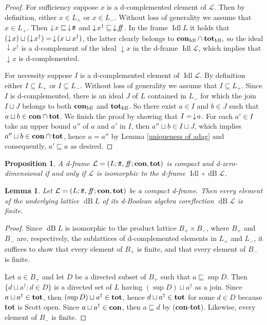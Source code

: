 \documentclass[11pt]{article}
\DeclareMathOperator{\idl}{Idl}
\DeclareMathOperator{\dB}{dB}
\theoremstyle{plain}
\newtheorem{lem}[thm]{Lemma}
\newtheorem{prop}[thm]{Proposition}
\theoremstyle{definition}
\newcommand{\dbt}{{t\!t}}
\newcommand{\dbf}{{f\!\!f}}
\begin{document}
\begin{proof} For sufficiency suppose $x$ is a d-complemented element of $\mathcal{L}$. Then by definition, either $x\in L_+$ or $x\in L_-$. Without loss of generality we assume that  $x\in L_+$.  Then $\downarrow\!x\sqsubseteq\thinspace \downarrow\!\dbt$ and $\downarrow\!x^\dag\sqsubseteq\thinspace \downarrow\!\dbf$. In the frame $\idl L$ it holds that $(\downarrow\!x)\sqcup(\downarrow\!x^\dag)= \thinspace \downarrow\!(x\sqcup x^\dag)$, the latter clearly belongs to ${\bf con}_{\idl}\cap{\bf tot}_{\idl},$  so the ideal $\downarrow\!x^\dag$ is a d-complement of the ideal $\downarrow\!x$ in the d-frame $\idl\mathcal{L}$, which implies that $\downarrow\!x$ is  d-complemented. 

For necessity  suppose $I$ is a d-complemented element of $\idl \mathcal{L}$. By definition either $I\subseteq L_+$ or $I\subseteq L_-$. Without loss of generality we assume that $I\subseteq L_+$. Since $I$ is d-complemented, there is an ideal $J$ of $L$ contained in $L_-$ for which the join $I\sqcup J$ belongs to both ${\bf con}_{\idl}$ and ${\bf tot}_{\idl}$. So there exist $a\in I$ and $b\in J$ such that $a\sqcup b\in{\bf con}\cap{\bf tot}$. We finish the proof by  showing that $I=\thinspace\downarrow\!a$. For each $a'\in I$ take an upper bound $a''$ of $a$ and $a'$ in $I$, then $a''\sqcup b\in I\sqcup J$, which implies $a''\sqcup b\in {\bf con}\cap{\bf tot}$, hence $a=a''$ by Lemma \ref{uniqueness of adag} and consequently, $a'\sqsubseteq a$ as desired.  \end{proof}

\begin{prop}\label{other side of the duality} A d-frame  $\mathcal{L}=(L;\dbt,\dbf;{\bf con},{\bf tot})$ is   compact and d-zero-dimensional if and only if $\mathcal{L}$ is isomorphic to the d-frame   $ \idl\circ\dB \mathcal{L}$. 
\end{prop}
 
\begin{lem}\label{each element of dBL is finite}
Let $\mathcal{L}=(L;\dbt,\dbf;{\bf con},{\bf tot})$ be a compact d-frame. Then every element of the underlying lattice $\dB L$  of its d-Boolean algebra coreflection $\dB\mathcal{L}$ is finite.  \end{lem}  

\begin{proof}
Since $\dB L$ is isomorphic to the product lattice $B_+\times B_-$, where $B_+$ and $B_-$ are, respectively, the sublattices  of d-complemented elements in $L_+$ and $L_-$, it suffices to show that every element of $B_+$ is finite, and that every element of $B_-$ is finite. 

Let $a\in B_+$  and let $D$ be a directed subset of $B_+$ such that $a\sqsubseteq\sup D$. Then $\{d\sqcup a^\dag:d\in D\}$ is a directed set of $L$ having $(\sup D)\sqcup a^\dag$ as a join. Since $a\sqcup a^\dag \in{\bf tot}$, then $(\sup D)\sqcup a^\dag\in{\bf tot}$, hence $d\sqcup a^\dag\in{\bf tot}$ for some $d\in D$ because {\bf tot} is Scott open. Since $a\sqcup a^\dag\in{\bf con}$, then $a\sqsubseteq d$ by ({\bf con}-{\bf tot}). Likewise, every element of $B_-$ is finite.  \end{proof}
\end{document}
